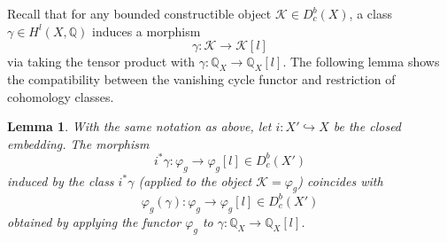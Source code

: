 \documentclass[11pt]{amsart}
\theoremstyle{plain}
\newtheorem{lem}[thm]{Lemma}
\theoremstyle{definition}
\theoremstyle{remark}
\newcommand{\BQ}{{\mathbb{Q}}}
\newcommand{\CK}{{\mathcal K}}
\begin{document}
Recall that for any bounded constructible object $\CK \in D^b_c(X)$, a class $\gamma \in H^l(X, \BQ)$ induces a morphism
\[
\gamma: \CK \to \CK [l] 
\]
via taking the tensor product with $\gamma: \BQ_X \to \BQ_X[l]$. The following lemma shows the compatibility between the vanishing cycle functor and restriction of cohomology classes.

\begin{lem}\label{lem1.3}
With the same notation as above, let $i: X'\hookrightarrow X$ be the closed embedding. The morphism \[
i^*\gamma: \varphi_g \rightarrow \varphi_g[l] \in D^b_c(X')
\]
induced by the class $i^*\gamma$ (applied to the object $\CK = \varphi_g$) coincides with 
\[
\varphi_g(\gamma): \varphi_g \to \varphi_g[l] \in D_c^b(X')
\]
obtained by applying the functor $\varphi_g$ to $\gamma: \BQ_X \to \BQ_X[l]$.
\end{lem}
\end{document}

